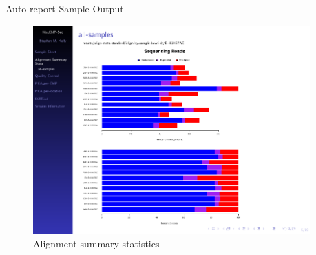 \documentclass[final]{beamer}
\newlength{\sepwid}
\newlength{\onecolwid}
\newlength{\twocolwid}
\begin{document}
\begin{frame}[t]
\begin{columns}[t]
\begin{column}{\sepwid}\end{column} %

\begin{column}{\twocolwid} %

\begin{columns}[t,totalwidth=\twocolwid] %

\begin{column}{\onecolwid}%

%	
\begin{beamerboxesrounded}{Auto-report Sample Output}

\begin{figure}
\includegraphics[width=1.0\linewidth, frame]{./Figures/alignStats}
\caption{Alignment summary statistics}
\label{fig:alignStats}
\end{figure}

\vspace{10cm}


\end{beamerboxesrounded}
\end{column}
\end{columns}
\end{column}
\end{columns}
\end{frame}
\end{document}
